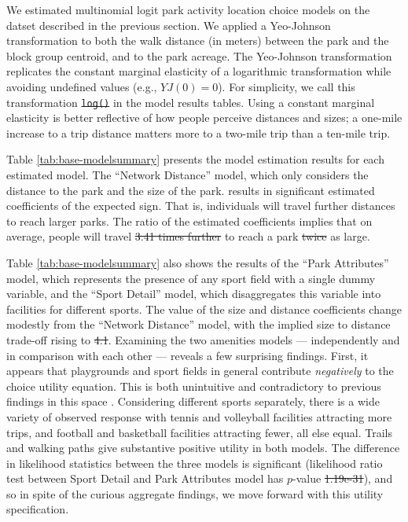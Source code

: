 \documentclass[3p, authoryear, review, doubleblind]{elsarticle} %
\providecommand{\DIFaddtex}[1]{{\protect\color{blue}\uwave{#1}}} %
\providecommand{\DIFdeltex}[1]{{\protect\color{red}\sout{#1}}}                      %
\providecommand{\DIFaddbegin}{} %
\providecommand{\DIFaddend}{} %
\providecommand{\DIFdelbegin}{} %
\providecommand{\DIFdelend}{} %
\providecommand{\DIFadd}[1]{\texorpdfstring{\DIFaddtex{#1}}{#1}} %
\providecommand{\DIFdel}[1]{\texorpdfstring{\DIFdeltex{#1}}{}} %
\newcommand{\DIFscaledelfig}{0.5}
\newlength{\DIFdelgraphicswidth} %
\newlength{\DIFdelgraphicsheight} %
\newcommand{\DIFaddincludegraphics}[2][]{{\color{blue}\fbox{\DIFOincludegraphics[#1]{#2}}}} %
\newcommand{\DIFdelincludegraphics}[2][]{%
\sbox{\DIFdelgraphicsbox}{\DIFOincludegraphics[#1]{#2}}%
\settoboxwidth{\DIFdelgraphicswidth}{\DIFdelgraphicsbox} %
\settoboxtotalheight{\DIFdelgraphicsheight}{\DIFdelgraphicsbox} %
\scalebox{\DIFscaledelfig}{%
\parbox[b]{\DIFdelgraphicswidth}{\usebox{\DIFdelgraphicsbox}\\[-\baselineskip] \rule{\DIFdelgraphicswidth}{0em}}\llap{\resizebox{\DIFdelgraphicswidth}{\DIFdelgraphicsheight}{%
\setlength{\unitlength}{\DIFdelgraphicswidth}%
\begin{picture}(1,1)%
\thicklines\linethickness{2pt} %
{\color[rgb]{1,0,0}\put(0,0){\framebox(1,1){}}}%
{\color[rgb]{1,0,0}\put(0,0){\line( 1,1){1}}}%
{\color[rgb]{1,0,0}\put(0,1){\line(1,-1){1}}}%
\end{picture}%
}\hspace*{3pt}}} %
} %
\DeclareRobustCommand{\DIFaddbegin}{\DIFOaddbegin \let\includegraphics\DIFaddincludegraphics} %
\DeclareRobustCommand{\DIFaddend}{\DIFOaddend \let\includegraphics\DIFOincludegraphics} %
\DeclareRobustCommand{\DIFdelbegin}{\DIFOdelbegin \let\includegraphics\DIFdelincludegraphics} %
\DeclareRobustCommand{\DIFdelend}{\DIFOaddend \let\includegraphics\DIFOincludegraphics} %
\begin{document}
We estimated multinomial logit park activity location choice models on the
datset described in the previous section. We applied a Yeo-Johnson
transformation \citep{Yeo2000} to both the walk distance (in meters) between the
park and the block group centroid, and to the park acreage. The Yeo-Johnson
transformation replicates the constant marginal elasticity of a logarithmic
transformation while avoiding undefined values (e.g., \(YJ(0) = 0\)). For
simplicity, we call this transformation \DIFdelbegin \texttt{\DIFdel{log()}} %
\DIFdelend \DIFaddbegin \DIFadd{\(\log()\) }\DIFaddend in the model results tables.
Using a constant marginal elasticity is better reflective of how people perceive
distances and sizes; a one-mile increase to a trip distance matters more to a
two-mile trip than a ten-mile trip.

Table \ref{tab:base-modelsummary} presents the model estimation results for
each estimated model. The ``Network Distance'' model, which only considers the
distance to the park and the size of the park. results in significant estimated
coefficients of the expected sign. That is, individuals will travel further
distances to reach larger parks. The ratio of the estimated coefficients implies
that on average, people will travel \DIFdelbegin \DIFdel{3.41 times further }\DIFdelend \DIFaddbegin \DIFadd{twice as far }\DIFaddend to reach a park \DIFdelbegin \DIFdel{twice }\DIFdelend \DIFaddbegin \DIFadd{3.47
times }\DIFaddend as large.

Table \ref{tab:base-modelsummary} also shows the results of the ``Park
Attributes'' model, which represents the presence of any sport field with a
single dummy variable, and the ``Sport Detail'' model, which disaggregates this
variable into facilities for different sports. The value of the size and
distance coefficients change modestly from the ``Network Distance'' model, with
the implied size to distance trade-off rising to \DIFdelbegin \DIFdel{4.1}\DIFdelend \DIFaddbegin \DIFadd{4.16}\DIFaddend . Examining
the two amenities models --- independently and in comparison with each other ---
reveals a few surprising findings. First, it appears that playgrounds and sport
fields in general contribute \emph{negatively} to the choice utility equation. This
is both unintuitive and contradictory to previous findings in this space \citep[e.g.,][]{Kinnell2006}. Considering different sports separately, there is a wide variety
of observed response with tennis and volleyball facilities attracting more
trips, and football and basketball facilities attracting fewer, all else equal.
Trails and walking paths give substantive positive utility in both models. The
difference in likelihood statistics between the three models is significant
(likelihood ratio test between Sport Detail and Park Attributes model has
\(p\)-value \DIFdelbegin \DIFdel{1.19e-31}\DIFdelend \DIFaddbegin \DIFadd{2.68e-06}\DIFaddend ), and so in spite of the curious aggregate findings,
we move forward with this utility specification.
\end{document}

